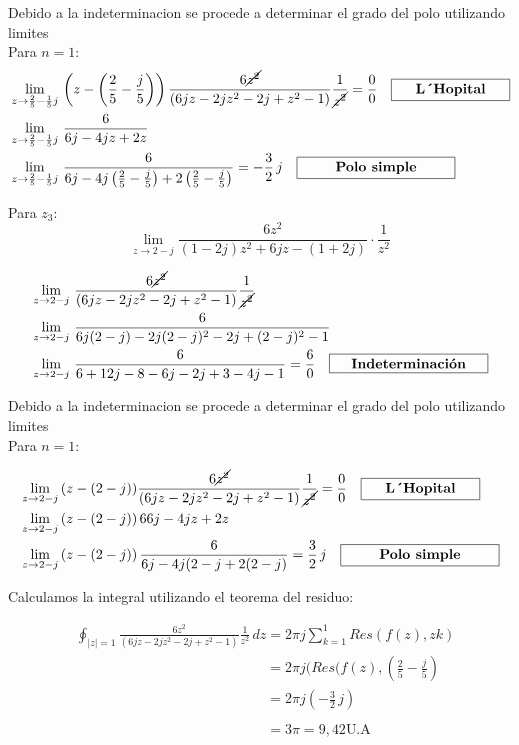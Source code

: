\documentclass[12pt]{report}
\begin{document}
Debido a la indeterminacion se procede a determinar el grado del polo utilizando limites\\[8pt]
Para $n=1$:
\begin{align*}
&\lim_{z \to \frac{2}{5}-\frac{1}{5}j}\,\left(z-\left( \frac{2}{5}-\frac{j}{5} \right)\right)\frac{6\cancel{z^2}}{(6jz-2jz^2-2j+z^2-1)}\frac{1}{\cancel{z^2}}=\frac{0}{0} \quad \framebox[3cm][c]{\textbf{L´Hopital}}\\
&\lim_{z \to \frac{2}{5}-\frac{1}{5}j}\,\frac{6}{6j-4jz+2z}\\
&\lim_{z \to \frac{2}{5}-\frac{1}{5}j}\,\frac{6}{6j-4j\left(\frac{2}{5}-\frac{j}{5} \right) +2 \left(\frac{2}{5}-\frac{j}{5} \right)}= -\frac{3}{2}\, j \quad \framebox[4cm][c]{\textbf{Polo simple}}\\
\end{align*}


Para $z_3$:
$$\lim_{z \to 2-j}\frac{6z^2}{(1- 2j)z^{2} + 6jz - (1 + 2j)} \cdot \frac{1}{z^2}
$$

\begin{align*}
&\lim_{z \to 2-j}\,\frac{6\cancel{z^2}}{(6jz-2jz^2-2j+z^2-1)}\frac{1}{\cancel{z^2}}\\
&\lim_{z \to 2-j}\, \frac{6}{6j(2-j)-2j(2-j)^2-2j+(2-j)^2-1}\\
&\lim_{z \to 2-j}\,\frac{6}{6+12j-8-6j-2j+3-4j-1}= \frac{6}{0} \quad \framebox[4cm][c]{\textbf{Indeterminación}}\\
\end{align*}

Debido a la indeterminacion se procede a determinar el grado del polo utilizando limites\\[8pt]
Para $n=1$:

\begin{align*}
&\lim_{z \to 2-j}\,(z-(2-j))\frac{6\cancel{z^2}}{(6jz-2jz^2-2j+z^2-1)}\frac{1}{\cancel{z^2}}=\frac{0}{0}\quad \framebox[3cm][c]{\textbf{L´Hopital}}\\
&\lim_{z \to 2-j}\,(z-(2-j))\, {6}{6j-4jz+2z}\\
&\lim_{z \to 2-j}\,(z-(2-j))\, \frac{6}{6j-4j(2-j+2(2-j)}=\frac{3}{2} \, j \quad \framebox[4cm][c]{\textbf{Polo simple}}\\
\end{align*}

Calculamos la integral utilizando el teorema del residuo:

\begin{align*}
& \oint_{|z|=1} \frac{6z^2}{(6jz-2jz^2-2j+z^2-1)}\frac{1}{z^2}\, dz= 2\pi j \sum_{k=1}^1 Res(f(z),zk)\\
&\phantom{\oint_{|z|=1} \frac{6z^2}{(6jz-2jz^2-2j+z^2-1)}\frac{1}{z^2}\, dz}=2\pi j (Res(f(z),\left( \frac{2}{5}-\frac{j}{5} \right)\\
&\phantom{\oint_{|z|=1} \frac{6z^2}{(6jz-2jz^2-2j+z^2-1)}\frac{1}{z^2}\, dz}=2\pi j \left( -\frac{3}{2}\,j \right)\\
&\phantom{\oint_{|z|=1} \frac{6z^2}{(6jz-2jz^2-2j+z^2-1)}\frac{1}{z^2}\, dz}=3\pi = 9,42 \text{U.A}\\
\end{align*}
\end{document}
